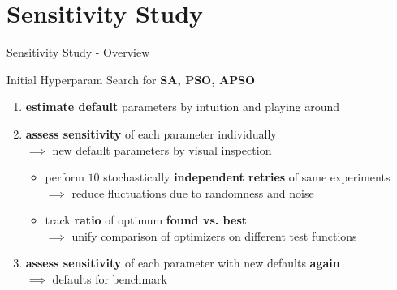 \documentclass[11pt,aspectratio=169]{beamer}
\begin{document}
%
%

\section{Sensitivity Study}

%
%

\begin{frame}[fragile]{Sensitivity Study - Overview}

    Initial Hyperparam Search for \textbf{SA, PSO, APSO}
    \begin{enumerate}
        \item \textbf{estimate default} parameters by intuition and playing around
        \item \textbf{assess sensitivity} of each parameter individually\\
            $\implies$ new default parameters by visual inspection
            \begin{itemize}
                \item perform $10$ stochastically \textbf{independent retries} of same experiments\\
                    $\implies$ reduce fluctuations due to randomness and noise
                \item track \textbf{ratio} of optimum \textbf{found vs. best}\\
                    $\implies$ unify comparison of optimizers on different test functions
            \end{itemize}
        \item \textbf{assess sensitivity} of each parameter with new defaults \textbf{again}\\
            $\implies$ defaults for benchmark
    \end{enumerate}
\end{frame}

%
%
\end{document}

